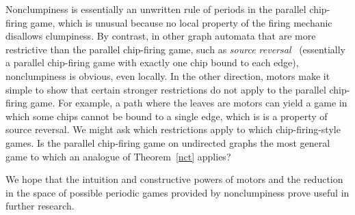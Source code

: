 Nonclumpiness is essentially an unwritten rule of periods in the parallel
chip-firing game, which is unusual because no local property of the firing
mechanic disallows clumpiness. By contrast, in other graph automata that are
more restrictive than the parallel chip-firing game, such as \emph{source
  reversal}~\cite{sourceReversal} (essentially a parallel chip-firing game with
exactly one chip bound to each edge), nonclumpiness is obvious, even
locally. In the other direction, motors make it simple to show that certain
stronger restrictions do not apply to the parallel chip-firing game. For
example, a path where the leaves are motors can yield a game in which some
chips cannot be bound to a single edge, which is is a property of source
reversal. We might ask which restrictions apply to which chip-firing-style
games. Is the parallel chip-firing game on undirected graphs the most general
game to which an analogue of Theorem~\ref{nct} applies?

We hope that the intuition and constructive powers of motors and the reduction
in the space of possible periodic games provided by nonclumpiness prove useful
in further research. \FloatBarrier
